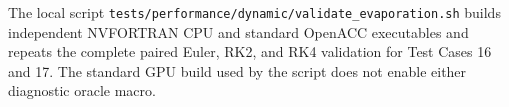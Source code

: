 The local script
\texttt{tests/performance/dynamic/validate\_evaporation.sh} builds independent
NVFORTRAN CPU and standard OpenACC executables and repeats the complete paired
Euler, RK2, and RK4 validation for Test Cases 16 and 17.  The standard GPU
build used by the script does not enable either diagnostic oracle macro.
